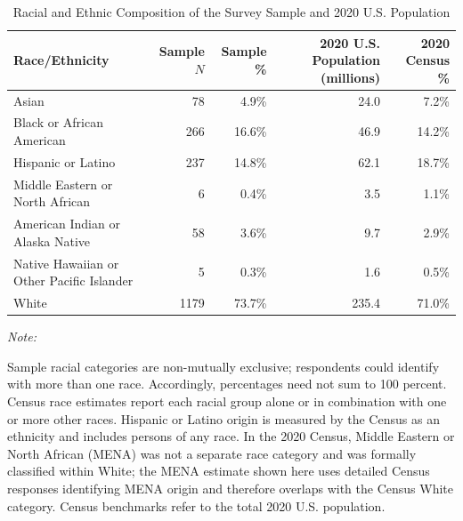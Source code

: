 \begin{table}[!h]
\centering
\caption{\label{tab:tab:race_census_comparison}Racial and Ethnic Composition of the Survey Sample and 2020 U.S. Population}
\centering
\begin{threeparttable}
\begin{tabular}[t]{lrrrr}
\toprule
Race/Ethnicity & Sample $N$ & Sample \% & 2020 U.S. Population (millions) & 2020 Census \%\\
\midrule
Asian & 78 & 4.9\% & 24.0 & 7.2\%\\
Black or African American & 266 & 16.6\% & 46.9 & 14.2\%\\
Hispanic or Latino & 237 & 14.8\% & 62.1 & 18.7\%\\
Middle Eastern or North African & 6 & 0.4\% & 3.5 & 1.1\%\\
American Indian or Alaska Native & 58 & 3.6\% & 9.7 & 2.9\%\\
\addlinespace
Native Hawaiian or Other Pacific Islander & 5 & 0.3\% & 1.6 & 0.5\%\\
White & 1179 & 73.7\% & 235.4 & 71.0\%\\
\bottomrule
\end{tabular}
\begin{tablenotes}
\item \textit{Note:} 
\item Sample racial categories are non-mutually exclusive; respondents could identify with more than one race. Accordingly, percentages need not sum to 100 percent. Census race estimates report each racial group alone or in combination with one or more other races. Hispanic or Latino origin is measured by the Census as an ethnicity and includes persons of any race. In the 2020 Census, Middle Eastern or North African (MENA) was not a separate race category and was formally classified within White; the MENA estimate shown here uses detailed Census responses identifying MENA origin and therefore overlaps with the Census White category. Census benchmarks refer to the total 2020 U.S. population.
\end{tablenotes}
\end{threeparttable}
\end{table}
